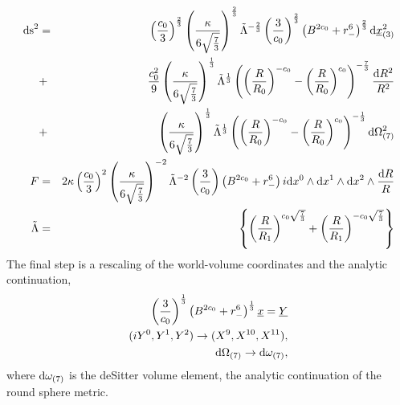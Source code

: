 \documentclass[a4paper,11pt]{article}
\begin{document}
\begin{eqnarray}
{\rm ds}^2&=&\left(\frac{c_0}{3}\right)^{\frac{2}{3}}
             \left(\frac{\kappa}{6\sqrt{\frac{7}{3}}}\right)^{\frac{2}{3}}
             \tilde{\Lambda}^{-\frac{2}{3}}
          \left(\frac{3}{c_0}\right)^{\frac{2}{3}}
          \left(B^{2c_0}+r_-^6\right)^{\frac{2}{3}}{\rm d}\underline{x}_{(3)}^2\\
\nonumber
&+&\frac{c_0^2}{9}\left(\frac{\kappa}{6\sqrt{\frac{7}{3}}}\right)^{\frac{1}{3}}
      \tilde{\Lambda}^{\frac{1}{3}}
      \left(  \left(\frac{R}{R_0}\right)^{-c_0}
             -\left(\frac{R}{R_0}\right)^{c_0}
      \right)^{-\frac{7}{3}}\frac{{\rm d}R^2}{R^2}\\
\nonumber
&+&\left(\frac{\kappa}{6\sqrt{\frac{7}{3}}}\right)^{\frac{1}{3}}
     \tilde{\Lambda}^{\frac{1}{3}}
      \left(  \left(\frac{R}{R_0}\right)^{-c_0}
             -\left(\frac{R}{R_0}\right)^{c_0}
      \right)^{-\frac{1}{3}}{\rm d}\Omega_{(7)}^2\\
F&=&2\kappa\left(\frac{c_0}{3}\right)^2
     \left(\frac{\kappa}{6\sqrt{\frac{7}{3}}}\right)^{-2}
    \tilde{\Lambda}^{-2}
    \left(\frac{3}{c_0}\right)
    \left(B^{2c_0}+r_-^6\right)
    i{\rm d}x^0\wedge{\rm d}x^1\wedge{\rm d}x^2\wedge\frac{{\rm d}R}{R}\\
\tilde{\Lambda}&=&\left\{ \left(\frac{R}{R_1}\right)^{c_0\sqrt{\frac{7}{3}}}
                    +\left(\frac{R}{R_1}\right)^{-c_0\sqrt{\frac{7}{3}}}
             \right\}
\end{eqnarray}
The final step is a rescaling of the world-volume coordinates and the analytic
continuation,
\begin{eqnarray}
\left(\frac{3}{c_0}\right)^{\frac{1}{3}}
\left(B^{2c_0}+r_-^6\right)^{\frac{1}{3}}\underline{x}=\underline{Y}\\
(iY^0,Y^1,Y^2)\rightarrow(X^9,X^{10},X^{11}),\\
{\rm d}\Omega_{(7)}\rightarrow{\rm d}\omega_{(7)},
\end{eqnarray}
where ${\rm d}\omega_{(7)}$ is the deSitter volume element, the analytic
continuation of the round sphere metric.
\end{document}
